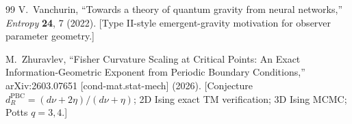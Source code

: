 \documentclass[11pt]{article}
\theoremstyle{definition}
\theoremstyle{remark}
\begin{document}
\begin{thebibliography}{99}
V.\ Vanchurin,
``Towards a theory of quantum gravity from neural networks,''
\textit{Entropy} \textbf{24}, 7 (2022).
[Type II-style emergent-gravity motivation for observer parameter geometry.]

M.~Zhuravlev,
``Fisher Curvature Scaling at Critical Points: An Exact Information-Geometric Exponent
from Periodic Boundary Conditions,''
arXiv:2603.07651 [cond-mat.stat-mech] (2026).
[Conjecture $d_R^{\mathrm{PBC}} = (d\nu+2\eta)/(d\nu+\eta)$;
2D Ising exact TM verification; 3D Ising MCMC; Potts $q=3,4$.]

\end{thebibliography}
\end{document}
